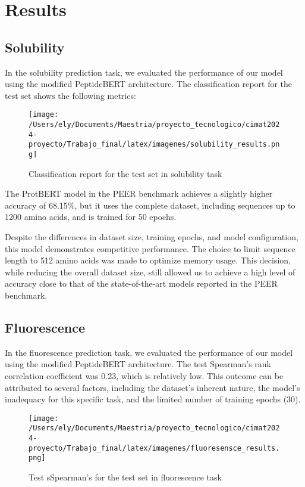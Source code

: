 \documentclass[letterpaper,spanish,reprint,nofootinbib,showkeys,aps]{revtex4-2}
\begin{document}
\section{Results}

\subsection*{Solubility}
In the solubility prediction task, we evaluated the performance of our model using the modified PeptideBERT architecture. The classification report for the test set shows the following metrics: 


\begin{figure} [H]
	\begin{center}
		\texttt{[image: /Users/ely/Documents/Maestria/proyecto\_tecnologico/cimat2024-proyecto/Trabajo\_final/latex/imagenes/solubility\_results.png]}
		\caption{Classification report for the test set in solubility task}
   \end{center} 
\end{figure}


The ProtBERT model in the PEER benchmark achieves a slightly higher accuracy of 68.15$\%$, but it uses the complete dataset, including sequences up to 1200 amino acids, and is trained for 50 epochs. 

Despite the differences in dataset size, training epochs, and model configuration, this model demonstrates competitive performance. The choice to limit sequence length to 512 amino acids was made to optimize memory usage. This decision, while reducing the overall dataset size, still allowed us to achieve a high level of accuracy close to that of the state-of-the-art models reported in the PEER benchmark.

\subsection*{Fluorescence}


In the fluorescence prediction task, we evaluated the performance of our model using the modified PeptideBERT architecture. The test Spearman's rank correlation coefficient was 0.23, which is relatively low. This outcome can be attributed to several factors, including the dataset's inherent nature, the model's inadequacy for this specific task, and the limited number of training epochs (30).

\begin{figure} [H]
	\begin{center}
		\texttt{[image: /Users/ely/Documents/Maestria/proyecto\_tecnologico/cimat2024-proyecto/Trabajo\_final/latex/imagenes/fluoresensce\_results.png]}
		\caption{Test sSpearman's for the test set in fluorescence task}
   \end{center} 
\end{figure}
\end{document}
